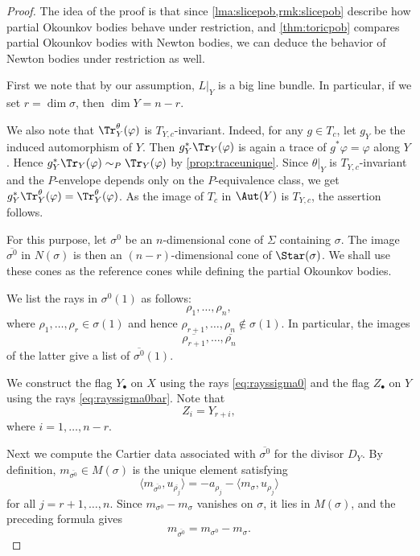 \begin{proof}
    The idea of the proof is that since \cref{lma:slicepob,rmk:slicepob} describe how partial Okounkov bodies behave under restriction, and \cref{thm:toricpob} compares partial Okounkov bodies with Newton bodies, we can deduce the behavior of Newton bodies under restriction as well.

    First we note that by our assumption, $L|_Y$ is a big line bundle. In particular, if we set $r=\dim \sigma$, then $\dim Y=n-r$.

    We also note that $\Tr_Y^\theta(\varphi)$ is $T_{Y,c}$-invariant. Indeed, for any $g\in T_c$, let $g_Y$ be the induced automorphism of $Y$. Then $g_Y^*\Tr_Y(\varphi)$ is again a trace of $g^*\varphi=\varphi$ along $Y$. Hence $g_Y^*\Tr_Y(\varphi)\sim_P\Tr_Y(\varphi)$ by \cref{prop:traceunique}. Since $\theta|_Y$ is $T_{Y,c}$-invariant and the $P$-envelope depends only on the $P$-equivalence class, we get $g_Y^*\Tr_Y^\theta(\varphi)=\Tr_Y^\theta(\varphi)$. As the image of $T_c$ in $\Aut(Y)$ is $T_{Y,c}$, the assertion follows.

    For this purpose, let $\sigma^0$ be an $n$-dimensional cone of $\Sigma$ containing $\sigma$. The image $\overline{\sigma^0}$ in $N(\sigma)$ is then an $(n-r)$-dimensional cone of $\Star(\sigma)$. We shall use these cones as the reference cones while defining the partial Okounkov bodies.

    We list the rays in $\sigma^0(1)$ as follows:
    \begin{equation}\label{eq:rayssigma0}
        \rho_1,\ldots,\rho_n,
    \end{equation}
    where $\rho_1,\ldots,\rho_r\in \sigma(1)$
    and hence $\rho_{r+1},\ldots,\rho_n\not\in \sigma(1)$. In particular, the images
    \begin{equation}\label{eq:rayssigma0bar}
        \overline{\rho_{r+1}},\ldots,\overline{\rho_{n}}
    \end{equation}
    of the latter give a list of $\overline{\sigma^0}(1)$.

    We construct the flag $Y_{\bullet}$ on $X$ using the rays \eqref{eq:rayssigma0} and the flag $Z_{\bullet}$ on $Y$ using the rays \eqref{eq:rayssigma0bar}. Note that
    \[
        Z_i=Y_{r+i},
    \]
    where $i=1,\ldots,n-r$.

    Next we compute the Cartier data associated with $\overline{\sigma^0}$ for the divisor $D_Y$. By definition, $m_{\overline{\sigma^0}}\in M(\sigma)$ is the unique element satisfying
    \[
        \langle m_{\overline{\sigma^0}},u_{\overline{\rho_j}}\rangle=-a_{\rho_j}-\langle m_{\sigma},u_{\rho_j}\rangle
    \]
    for all $j=r+1,\ldots,n$.
    Since $m_{\sigma^0}-m_{\sigma}$ vanishes on $\sigma$, it lies in $M(\sigma)$, and the preceding formula gives
    \[
        m_{\overline{\sigma^0}}=m_{\sigma^0}-m_{\sigma}.
    \]


\end{proof}
